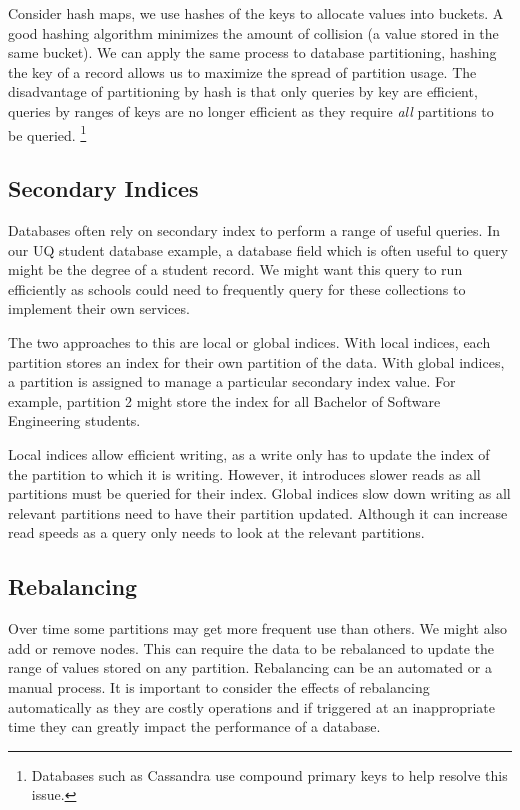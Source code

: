 Consider hash maps,
we use hashes of the keys to allocate values into buckets.
A good hashing algorithm minimizes the amount of collision (a value stored in the same bucket).
We can apply the same process to database partitioning,
hashing the key of a record allows us to maximize the spread of partition usage.
The disadvantage of partitioning by hash is that only queries by key are efficient,
queries by ranges of keys are no longer efficient as they require \emph{all} partitions to be queried.%
\footnote{Databases such as Cassandra use compound primary keys to help resolve this issue.}

\subsection*{Secondary Indices}

Databases often rely on secondary index to perform a range of useful queries.
In our UQ student database example,
a database field which is often useful to query might be the degree of a student record.
We might want this query to run efficiently as schools could need to frequently query for these collections to implement their own services.

The two approaches to this are local or global indices.
With local indices, each partition stores an index for their own partition of the data.
With global indices, a partition is assigned to manage a particular secondary index value.
For example, partition 2 might store the index for all Bachelor of Software Engineering students.

Local indices allow efficient writing,
as a write only has to update the index of the partition to which it is writing.
However, it introduces slower reads as all partitions must be queried for their index.
Global indices slow down writing as all relevant partitions need to have their partition updated.
Although it can increase read speeds as a query only needs to look at the relevant partitions.

\subsection{Rebalancing}

Over time some partitions may get more frequent use than others.
We might also add or remove nodes.
This can require the data to be rebalanced to update the range of values stored on any partition.
Rebalancing can be an automated or a manual process.
It is important to consider the effects of rebalancing automatically as they are costly operations
and if triggered at an inappropriate time they can greatly impact the performance of a database.


